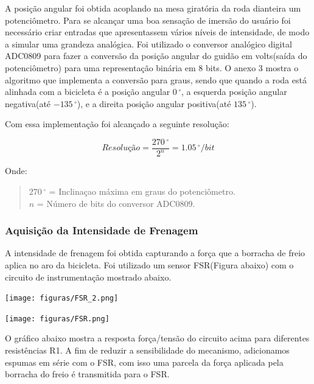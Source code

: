 A posição angular foi obtida acoplando na mesa giratória da roda dianteira um potenciômetro. Para se alcançar uma boa sensação de imersão do usuário foi necessário  criar entradas  que apresentassem  vários níveis de intensidade, de modo a simular uma grandeza analógica. Foi utilizado o conversor  analógico digital ADC0809 para fazer a conversão da posição angular do guidão em volts(saída do potenciômetro) para uma representação binária em 8 bits. O anexo 3 mostra o algoritmo que implementa a conversão para graus, sendo que quando a roda está alinhada com a bicicleta é a posição angular $0\,^{\circ}$, a esquerda posição angular negativa(até $-135\,^{\circ}$), e a direita posição angular positiva(até $135\,^{\circ}$).

Com essa implementação foi alcançado a seguinte resolução:

\begin{equation}
Resolução =  \frac{270\,^{\circ}}{2^n} = 1.05\,^{\circ}/bit
\label{apon}
\end{equation}

Onde:
\begin{quote}
$270\,^{\circ}$ = Inclinaçao máxima em graus do potenciômetro.\\
$n$ =  Número de bits do conversor ADC0809.\\
\end{quote}



\subsubsection{Aquisição da Intensidade de Frenagem}

A intensidade de frenagem foi obtida capturando a força que a borracha de freio aplica no aro da bicicleta. Foi utilizado um sensor FSR(Figura abaixo) com o circuito de instrumentação mostrado abaixo.

            \begin{center}
   	\texttt{[image: figuras/FSR\_2.png]}
        \label{fsr}
   \end{center}

            \begin{center}
   	\texttt{[image: figuras/FSR.png]}
        \label{con_fsr}
   \end{center}

O gráfico abaixo mostra a resposta força/tensão do circuito acima para diferentes resistências R1.  A fim de reduzir a sensibilidade do mecanismo, adicionamos espumas em série com o FSR, com isso uma parcela da força aplicada pela borracha do freio é transmitida para o FSR.

